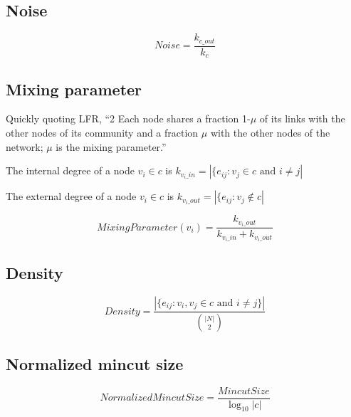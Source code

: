 \documentclass[aps,pre,superscriptaddress]{revtex4}
\begin{document}
\subsection{Noise}

\begin{equation}
	Noise = \frac{k_{c\_out}}{k_{c}}
\end{equation}

\subsection{Mixing parameter}
Quickly quoting LFR, ``2 Each node shares a fraction 1-$\mu$ of its links with the other nodes of its community and a fraction $\mu$ with the other nodes of the network; $\mu$ is the mixing parameter.''

The internal degree of a node $v_{i} \in c$ is $k_{v_{i}\_{in}}=|\{e_{ij} :v_{j} \in c \text{ and } i \neq j|$

The external degree of a node $v_{i} \in c$ is $k_{v_{i}\_{out}}=|\{e_{ij} :v_{j} \notin c |$

\begin{equation}
	MixingParameter(v_{i}) = \frac{k_{v_{i}\_out}}{k_{v_{i}\_in} + k_{v_{i}\_out}}
\end{equation}

\subsection{Density}
\begin{equation}
	Density=\frac{|\{e_{ij} : v_{i},v_{j} \in c \text{ and } i \neq j\}|}{{\binom{|N|}{2}}}
\end{equation}

\subsection{Normalized mincut size}
\begin{equation}
	NormalizedMincutSize=\frac{MincutSize}{\log_{10}{|c|}}
\end{equation}

\end{document}
